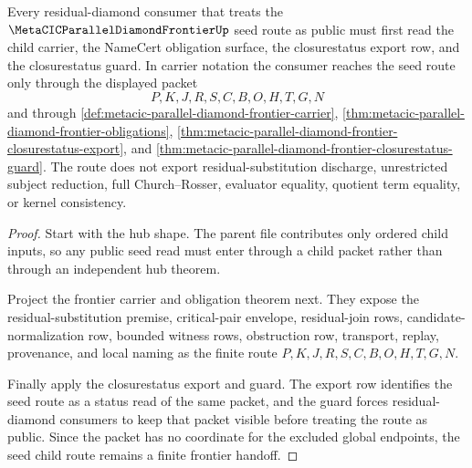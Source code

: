 \begin{theorem}
\label{thm:metacic-parallel-diamond-frontier-seed-child-route}
Every residual-diamond consumer that treats the $\MetaCICParallelDiamondFrontierUp$ seed route as public must first read the child carrier, the NameCert obligation surface, the closurestatus export row, and the closurestatus guard. In carrier notation the consumer reaches the seed route only through the displayed packet
$$
P,K,J,R,S,C,B,O,H,T,G,N
$$
and through \autoref{def:metacic-parallel-diamond-frontier-carrier}, \autoref{thm:metacic-parallel-diamond-frontier-obligations}, \autoref{thm:metacic-parallel-diamond-frontier-closurestatus-export}, and \autoref{thm:metacic-parallel-diamond-frontier-closurestatus-guard}. The route does not export residual-substitution discharge, unrestricted subject reduction, full Church--Rosser, evaluator equality, quotient term equality, or kernel consistency.
\end{theorem}
\begin{proof}
Start with the hub shape. The parent file contributes only ordered child inputs, so any public seed read must enter through a child packet rather than through an independent hub theorem.

Project the frontier carrier and obligation theorem next. They expose the residual-substitution premise, critical-pair envelope, residual-join rows, candidate-normalization row, bounded witness rows, obstruction row, transport, replay, provenance, and local naming as the finite route $P,K,J,R,S,C,B,O,H,T,G,N$.

Finally apply the closurestatus export and guard. The export row identifies the seed route as a status read of the same packet, and the guard forces residual-diamond consumers to keep that packet visible before treating the route as public. Since the packet has no coordinate for the excluded global endpoints, the seed child route remains a finite frontier handoff.
\end{proof}
